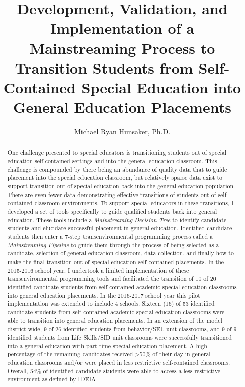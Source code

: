 \documentclass[twoside]{article}
\title{Development, Validation, and Implementation of a Mainstreaming Process to Transition Students from Self-Contained Special Education into General Education Placements}
\author[1]{Michael Ryan Hunsaker, Ph.D.}
\affil[1]{University of Utah, Salt Lake City, UT, USA}
\begin{document}
%
\maketitle
%
\begin{abstract}
One challenge presented to special educators is transitioning students out of special education self-contained settings and into the general education classroom. This challenge is compounded by there being an abundance of quality data that to guide placement into the special education classroom, but relatively sparse data exist to support transition out of special education back into the general education population. There are even fewer data demonstrating effective transitions of students out of self-contained classroom environments. To support special educators in these transitions, I developed a set of tools specifically to guide qualified students back into general education. These tools include a \textit{Mainstreaming Decision Tree} to identify candidate students and elucidate successful placement in general education. Identified candidate students then enter a 7-step transenvironmental programming process called a \textit{Mainstreaming Pipeline} to guide them through the process of being selected as a candidate, selection of general education classroom, data collection, and finally how to make the final transition out of special education self-contained placements. In the 2015-2016 school year, I undertook a limited implementation of these transenvironmental programming tools and facilitated the transition of 10 of 20 identified candidate students from self-contained academic special education classrooms into general education placements. In the 2016-2017 school year this pilot implementation was extended to include 4 schools. Sixteen (16) of 53 identified candidate students from self-contained academic special education classrooms were able to transition into general education placements. In an extension of the model district-wide, 9 of 26 identified students from behavior/SEL unit classrooms, and 9 of 9 identified students from Life Skills/SID unit classrooms were successfully transitioned into a general education with part-time special education placement. A high percentage of the remaining candidates received \textgreater50\% of their day in general education classrooms and/or were placed in less restrictive self-contained classrooms. Overall, 54\% of identified candidate students were able to access a less restrictive environment as defined by IDEIA
\end{abstract}
%
\end{document}
